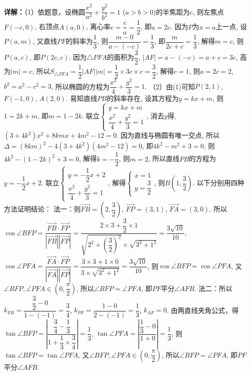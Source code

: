 \begin{question}[points=15]
\begin{solution}
\textbf{详解：}（1）依题意，设椭圆$\dfrac{x^2}{a^2} + \dfrac{y^2}{b^2} = 1$ ($a > b > 0$)的半焦距为$c$, 则左焦点$F(-c,0)$, 右顶点$A(a,0)$, 离心率$e = \dfrac{c}{a} = \dfrac{1}{2}$, 即$a = 2c$. 因为$P$为$x = a$上一点, 设$P(a,m)$, 又直线$PF$的斜率为$\dfrac{1}{3}$, 则$\dfrac{m - 0}{a - (-c)} = \dfrac{1}{3}$, 即$\dfrac{m}{2c + c} = \dfrac{1}{3}$, 解得$m = c$, 则$P(a,c)$, 即$P(2c,c)$. 因为$\triangle PFA$的面积为$\dfrac{3}{2}$, $|AF| = a - (-c) = a + c = 3c$, 高为$|m| = c$, 所以$S_{\triangle PFA} = \dfrac{1}{2} |AF| |m| = \dfrac{1}{2} \times 3c \times c = \dfrac{3}{2}$, 解得$c = 1$, 则$a = 2c = 2$, $b^2 = a^2 - c^2 = 3$, 所以椭圆的方程为$\dfrac{x^2}{4} + \dfrac{y^2}{3} = 1$.
（2）由(1)可知$P(2,1)$, $F(-1,0)$, $A(2,0)$. 易知直线$PB$的斜率存在, 设其方程为$y = kx + m$, 则$1 = 2k + m$, 即$m = 1 - 2k$. 联立$\begin{cases} y = kx + m \\ \dfrac{x^2}{4} + \dfrac{y^2}{3} = 1 \end{cases}$, 消去$y$得, $(3 + 4k^2)x^2 + 8kmx + 4m^2 - 12 = 0$. 因为直线与椭圆有唯一交点, 所以$\Delta = (8km)^2 - 4(3+4k^2)(4m^2 - 12) = 0$, 即$4k^2 - m^2 + 3 = 0$, 则$4k^2 - (1 - 2k)^2 + 3 = 0$, 解得$k = -\dfrac{1}{2}$, 则$m = 2$, 所以直线$PB$的方程为$y = -\dfrac{1}{2}x + 2$. 联立$\begin{cases} y = -\dfrac{1}{2}x + 2 \\ \dfrac{x^2}{4} + \dfrac{y^2}{3} = 1 \end{cases}$, 解得$\begin{cases} x = 1 \\ y = \dfrac{3}{2} \end{cases}$, 则$B(1, \dfrac{3}{2})$. 以下分别用四种方法证明结论：
法一：则$\overrightarrow{FB} = \left(2, \dfrac{3}{2}\right)$, $\overrightarrow{FP} = (3,1)$, $\overrightarrow{FA} = (3,0)$. 所以$\cos\angle BFP = \dfrac{\overrightarrow{FB} \cdot \overrightarrow{FP}}{|\overrightarrow{FB}||\overrightarrow{FP}|} = \dfrac{2 \times 3 + \dfrac{3}{2} \times 1}{\sqrt{2^2 + \left(\dfrac{3}{2}\right)^2} \times \sqrt{3^2 + 1^2}} = \dfrac{3\sqrt{10}}{10}$, $\cos\angle PFA = \dfrac{\overrightarrow{FA} \cdot \overrightarrow{FP}}{|\overrightarrow{FA}||\overrightarrow{FP}|} = \dfrac{3 \times 3 + 1 \times 0}{3 \times \sqrt{3^2 + 1^2}} = \dfrac{3\sqrt{10}}{10}$, 则$\cos\angle BFP = \cos\angle PFA$, 又$\angle BFP, \angle PFA \in (0, \dfrac{\pi}{2})$, 所以$\angle BFP = \angle PFA$, 即$PF$平分$\angle AFB$.
法二：所以$k_{FB} = \dfrac{\dfrac{3}{2} - 0}{1 - (-1)} = \dfrac{3}{4}$, $k_{PF} = \dfrac{1 - 0}{2 - (-1)} = \dfrac{1}{3}$, $k_{AF} = 0$. 由两直线夹角公式，得$\tan\angle BFP = \left|\dfrac{\dfrac{3}{4} - \dfrac{1}{3}}{1 + \dfrac{1}{3} \times \dfrac{3}{4}}\right| = \dfrac{1}{3}$, $\tan\angle PFA = \left|\dfrac{\dfrac{1}{3} - 0}{1 + 0}\right| = \dfrac{1}{3}$, 则$\tan\angle BFP = \tan\angle PFA$, 又$\angle BFP, \angle PFA \in (0, \dfrac{\pi}{2})$, 所以$\angle BFP = \angle PFA$, 即$PF$平分$\angle AFB$.

\end{solution}
\end{question}

